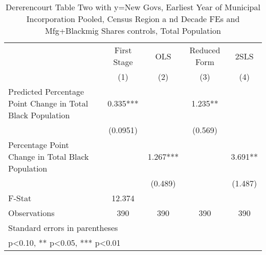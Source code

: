 \begin{table}[htbp]\centering
\def\sym#1{\ifmmode^{#1}\else\(^{#1}\)\fi}
\caption{Dererencourt Table Two with y=New Govs, Earliest Year of Municipal Incorporation  Pooled, Census Region a nd Decade FEs and Mfg+Blackmig Shares controls, Total Population}
\begin{tabular}{l*{4}{c}}
\toprule
                    & First Stage   &         OLS   &Reduced Form   &        2SLS   \\
                    &\multicolumn{1}{c}{(1)}   &\multicolumn{1}{c}{(2)}   &\multicolumn{1}{c}{(3)}   &\multicolumn{1}{c}{(4)}   \\
\midrule
Predicted Percentage Point Change in Total Black Population&       0.335***&               &       1.235** &               \\
                    &    (0.0951)   &               &     (0.569)   &               \\
\addlinespace
Percentage Point Change in Total Black Population&               &       1.267***&               &       3.691** \\
                    &               &     (0.489)   &               &     (1.487)   \\
\midrule
F-Stat              &      12.374   &               &               &               \\
Observations        &         390   &         390   &         390   &         390   \\
\bottomrule
\multicolumn{5}{l}{\footnotesize Standard errors in parentheses}\\
\multicolumn{5}{l}{\footnotesize * p<0.10, ** p<0.05, *** p<0.01}\\
\end{tabular}
\end{table}
